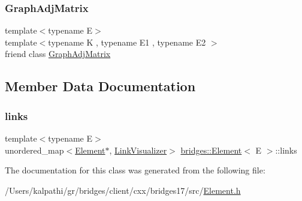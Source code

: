 \mbox{\label{classbridges_1_1_element_a1935808473b7eb8ff54149c5436c3ac9}} 
\subsubsection{\texorpdfstring{Graph\+Adj\+Matrix}{GraphAdjMatrix}}
{\footnotesize\ttfamily template$<$typename E$>$ \\
template$<$typename K , typename E1 , typename E2 $>$ \\
friend class \mbox{\hyperlink{classbridges_1_1_graph_adj_matrix}{Graph\+Adj\+Matrix}}\hspace{0.3cm}{\ttfamily [friend]}}



\subsection{Member Data Documentation}
\mbox{\label{classbridges_1_1_element_a6fb53728edc378f26238543b26238496}} 
\subsubsection{\texorpdfstring{links}{links}}
{\footnotesize\ttfamily template$<$typename E$>$ \\
unordered\+\_\+map$<$\mbox{\hyperlink{classbridges_1_1_element}{Element}}$\ast$, \mbox{\hyperlink{classbridges_1_1_link_visualizer}{Link\+Visualizer}}$>$ \mbox{\hyperlink{classbridges_1_1_element}{bridges\+::\+Element}}$<$ E $>$\+::links\hspace{0.3cm}{\ttfamily [protected]}}



The documentation for this class was generated from the following file\+:\begin{DoxyCompactItemize}
\item 
/\+Users/kalpathi/gr/bridges/client/cxx/bridges17/src/\mbox{\hyperlink{_element_8h}{Element.\+h}}\end{DoxyCompactItemize}
